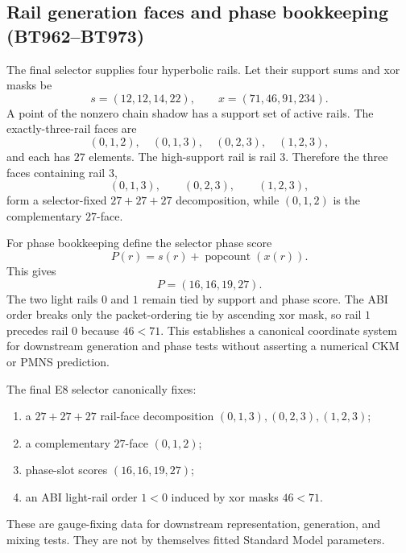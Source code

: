 
\subsection{Rail generation faces and phase bookkeeping (BT962--BT973)}\label{subsec:bt973-rail-generation-phase}

The final selector supplies four hyperbolic rails.  Let their support sums and
xor masks be
\[
  s=(12,12,14,22),\qquad x=(71,46,91,234).
\]
A point of the nonzero chain shadow has a support set of active rails.  The
exactly-three-rail faces are
\[
  (0,1,2),\quad (0,1,3),\quad (0,2,3),\quad (1,2,3),
\]
and each has \(27\) elements.  The high-support rail is rail \(3\).  Therefore
the three faces containing rail \(3\),
\[
  (0,1,3),\qquad (0,2,3),\qquad (1,2,3),
\]
form a selector-fixed \(27+27+27\) decomposition, while \((0,1,2)\) is the
complementary \(27\)-face.

For phase bookkeeping define the selector phase score
\[
  P(r)=s(r)+\operatorname{popcount}(x(r)).
\]
This gives
\[
  P=(16,16,19,27).
\]
The two light rails \(0\) and \(1\) remain tied by support and phase score.  The
ABI order breaks only the packet-ordering tie by ascending xor mask, so rail
\(1\) precedes rail \(0\) because \(46<71\).  This establishes a canonical
coordinate system for downstream generation and phase tests without asserting a
numerical CKM or PMNS prediction.

\begin{theorem}
The final E8 selector canonically fixes:
\begin{enumerate}
\item a \(27+27+27\) rail-face decomposition \((0,1,3),(0,2,3),(1,2,3)\);
\item a complementary \(27\)-face \((0,1,2)\);
\item phase-slot scores \((16,16,19,27)\);
\item an ABI light-rail order \(1<0\) induced by xor masks \(46<71\).
\end{enumerate}
These are gauge-fixing data for downstream representation, generation, and
mixing tests.  They are not by themselves fitted Standard Model parameters.
\end{theorem}
